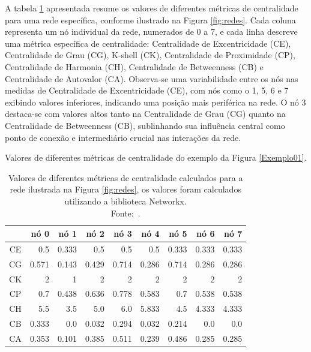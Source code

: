 A tabela \ref{tab:centralidade_rede} apresentada resume os valores de diferentes métricas de centralidade para uma rede específica, conforme ilustrado na Figura \ref{fig:redes}. Cada coluna representa um nó individual da rede, numerados de 0 a 7, e cada linha descreve uma métrica específica de centralidade: Centralidade de Excentricidade (\gls{CE}), Centralidade de Grau (\gls{CG}), K-shell (\gls{CK}), Centralidade de Proximidade (\gls{CP}), Centralidade de Harmonia (\gls{CH}), Centralidade de Betweenness (\gls{CB}) e Centralidade de Autovalor (\gls{CA}). Observa-se uma variabilidade entre os nós nas medidas de Centralidade de Excentricidade (\gls{CE}), com nós como o 1, 5, 6 e 7 exibindo valores inferiores, indicando uma posição mais periférica na rede. O nó 3 destaca-se com valores altos tanto na Centralidade de Grau (\gls{CG}) quanto na Centralidade de Betweenness (\gls{CB}), sublinhando sua influência central como ponto de conexão e intermediário crucial nas interações da rede.
\begin{table}[H]
    \captionsetup{width=13.5cm}
    \caption{Valores de diferentes métricas de centralidade do exemplo da Figura \ref{Exemplo01}.}
    \centering
    \begin{tabular}{crrrrrrrr}
        \toprule
        & nó 0 & nó 1 & nó 2 & nó 3 & nó 4 & nó 5 & nó 6 & nó 7 \\
        \midrule
        \midrule
        \gls{CE} & 0.5 & 0.333 & 0.5 & 0.5 & 0.5 & 0.333 & 0.333 & 0.333 \\
        \gls{CG} & 0.571 & 0.143 & 0.429 & 0.714 & 0.286 & 0.714 & 0.286 & 0.286 \\
        \gls{CK} & 2 & 1 & 2 & 2 & 2 & 2 & 2 & 2 \\
        \gls{CP} & 0.7 & 0.438 & 0.636 & 0.778 & 0.583 & 0.7 & 0.538 & 0.538 \\
        \gls{CH} & 5.5 & 3.5 & 5.0 & 6.0 & 5.833 & 4.5 & 4.333 & 4.333 \\
        \gls{CB} & 0.333 & 0.0 & 0.032 & 0.294 & 0.032 & 0.214 & 0.0 & 0.0 \\
        \gls{CA} & 0.353 & 0.101 & 0.385 & 0.511 & 0.239 & 0.486 & 0.285 & 0.285 \\
        \bottomrule
    \end{tabular}
    \caption*{Valores de diferentes métricas de centralidade calculados para a rede ilustrada na Figura \ref{fig:redes}, os valores foram calculados utilizando a biblioteca Networkx.\\ Fonte:~\cite{hagberg2008exploring}.}
    \label{tab:centralidade_rede}
\end{table}

